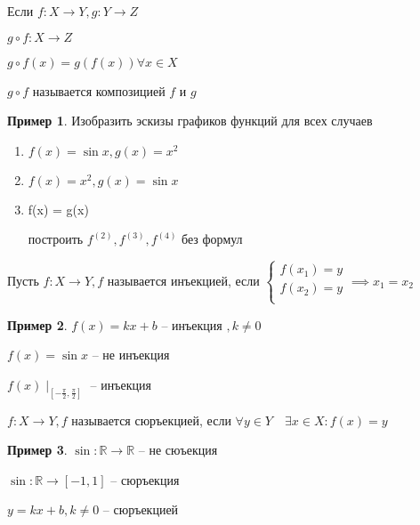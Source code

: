 \documentclass{book}
\newcommand\R{\ensuremath{\mathbb{R}}}
\theoremstyle{definition}
\newtheorem*{example}{Пример}
\begin{document}
\begin{definition}
    Если $f:X\to Y, g:Y\to Z$

    $g\circ f:X\to Z$

    $g\circ f(x) = g(f(x)) \forall x\in X$

    $g\circ f$ называется композицией $f$ и $g$
\end{definition}
\begin{example}
    Изобразить эскизы графиков функций для всех случаев
    \begin{enumerate}
        \item $f(x) = \sin  x, g(x) = x^2$
        \item $f(x) = x^2, g(x) = \sin  x$
        \item f(x) = g(x)


построить $f^{(2)}, f^{(3)}, f^{(4)}$ без формул
    \end{enumerate}

\end{example}
   \begin{definition}
       Пусть $f:X\to Y, f$ называется инъекцией, если $\begin{cases}
           f(x_1) = y\\
           f(x_2) = y\\
       \end{cases} \implies  x_1=x_2$
   \end{definition}
    \begin{example}
        $f(x) = kx+b$ -- инъекция $,k\neq 0$

        $f(x) = \sin x$ -- не инъекция

    $f(x)\mid_{[-\frac{\pi}{2}, \frac{\pi}{2}]  }$ -- инъекция

    \end{example}
    \begin{definition}
        $f:X\to Y, f$ называется сюръекцией, если $\forall y\in Y\quad \exists x\in X:f(x) = y$
    \end{definition}
    \begin{example}
        $\sin :\R\to \R$ -- не сюъекция

        $\sin :\R\to [-1,1]$ -- сюръекция

        $y = kx+b, k\neq 0$ -- сюръекцией
    \end{example}
\end{document}
